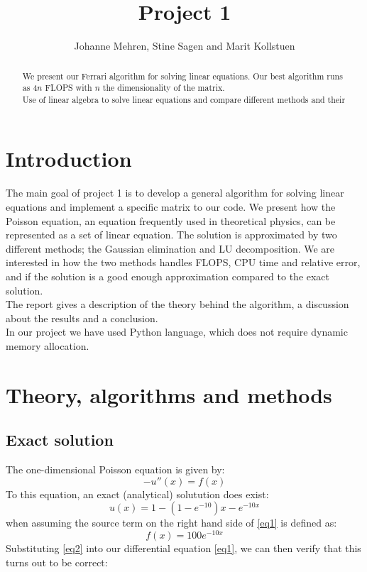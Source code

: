 \documentclass{article}
\title{Project 1}
\author{Johanne Mehren, Stine Sagen and Marit Kollstuen}
\begin{document}
\begin{abstract}
We present our Ferrari algorithm for solving linear equations. Our best algorithm runs as $4n$ FLOPS with $n$ the dimensionality of the matrix. \\
Use of linear algebra to solve linear equations and compare different methods and their 
\end{abstract}


\maketitle

\section{Introduction}
The main goal of project 1 is to develop a general algorithm for solving linear equations and implement a specific matrix to our code. We present how the Poisson equation, an equation frequently used in theoretical physics, can be represented as a set of linear equation. The solution is approximated by two different methods; the Gaussian elimination and LU decomposition. We are interested in how the two methods handles FLOPS, CPU time and relative error, and if the solution is a good enough approximation compared to the exact solution.   \\
The report gives a description of the theory behind the algorithm, a discussion about the results and a conclusion. \\ 
In our project we have used Python language, which does not require dynamic memory allocation. 


\section{Theory, algorithms and methods}
\subsection{Exact solution}
The one-dimensional Poisson equation is given by:
\begin{equation}\label{eq1} 
-u''(x) = f(x) 
\end{equation} 
To this equation, an exact (analytical) solutution does exist: 
\begin{equation}\label{eq2}
u(x) = 1 - (1-e^{-10})x - e^{-10x}
\end{equation}
when assuming the source term on the right hand side of \eqref{eq1} is defined as:
\begin{equation}\label{eq3}
f(x) = 100e^{-10x}
\end{equation} Substituting \eqref{eq2} into our differential equation \eqref{eq1}, we can then verify that this turns out to be correct:
\end{document}
